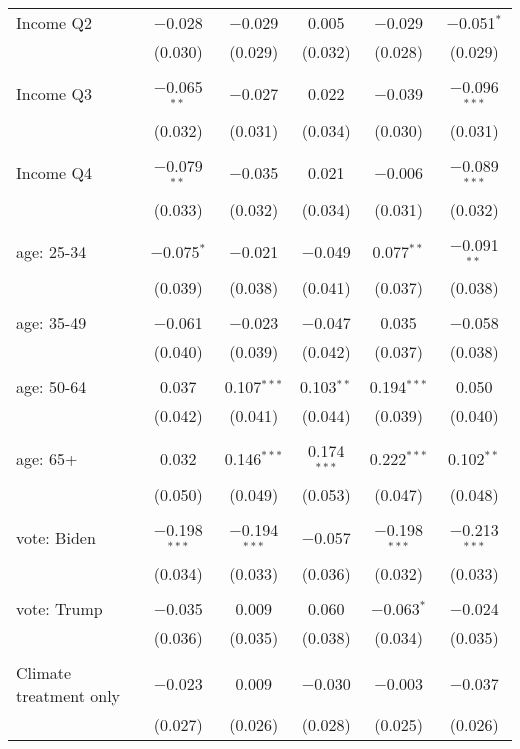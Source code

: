 \begin{tabular}{@{\extracolsep{5pt}}lccccc}
 Income Q2 & $-$0.028 & $-$0.029 & 0.005 & $-$0.029 & $-$0.051$^{*}$ \\ 
  & (0.030) & (0.029) & (0.032) & (0.028) & (0.029) \\ 
  & & & & & \\ 
 Income Q3 & $-$0.065$^{**}$ & $-$0.027 & 0.022 & $-$0.039 & $-$0.096$^{***}$ \\ 
  & (0.032) & (0.031) & (0.034) & (0.030) & (0.031) \\ 
  & & & & & \\ 
 Income Q4 & $-$0.079$^{**}$ & $-$0.035 & 0.021 & $-$0.006 & $-$0.089$^{***}$ \\ 
  & (0.033) & (0.032) & (0.034) & (0.031) & (0.032) \\ 
  & & & & & \\ 
 age: 25-34 & $-$0.075$^{*}$ & $-$0.021 & $-$0.049 & 0.077$^{**}$ & $-$0.091$^{**}$ \\ 
  & (0.039) & (0.038) & (0.041) & (0.037) & (0.038) \\ 
  & & & & & \\ 
 age: 35-49 & $-$0.061 & $-$0.023 & $-$0.047 & 0.035 & $-$0.058 \\ 
  & (0.040) & (0.039) & (0.042) & (0.037) & (0.038) \\ 
  & & & & & \\ 
 age: 50-64 & 0.037 & 0.107$^{***}$ & 0.103$^{**}$ & 0.194$^{***}$ & 0.050 \\ 
  & (0.042) & (0.041) & (0.044) & (0.039) & (0.040) \\ 
  & & & & & \\ 
 age: 65+ & 0.032 & 0.146$^{***}$ & 0.174$^{***}$ & 0.222$^{***}$ & 0.102$^{**}$ \\ 
  & (0.050) & (0.049) & (0.053) & (0.047) & (0.048) \\ 
  & & & & & \\ 
 vote: Biden & $-$0.198$^{***}$ & $-$0.194$^{***}$ & $-$0.057 & $-$0.198$^{***}$ & $-$0.213$^{***}$ \\ 
  & (0.034) & (0.033) & (0.036) & (0.032) & (0.033) \\ 
  & & & & & \\ 
 vote: Trump & $-$0.035 & 0.009 & 0.060 & $-$0.063$^{*}$ & $-$0.024 \\ 
  & (0.036) & (0.035) & (0.038) & (0.034) & (0.035) \\ 
  & & & & & \\ 
 Climate treatment only & $-$0.023 & 0.009 & $-$0.030 & $-$0.003 & $-$0.037 \\ 
  & (0.027) & (0.026) & (0.028) & (0.025) & (0.026) \\ 

\end{tabular}
